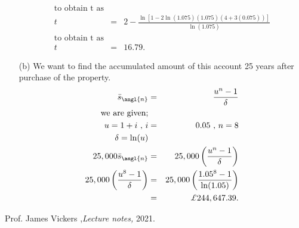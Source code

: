 \documentclass[12pt,a4paper]{article}
\begin{document}
\begin{enumerate}
\begin{eqnarray*}
 \text{to obtain t as}\\
  t&=& 2-\frac{\ln \left[1-2\ln(1.075)(1.075)(4+3(0.075)) \right]}{\ln(1.075)}\\
 \text{to obtain t as}\\
 t&=& 16.79.
\end{eqnarray*}
 \item[(b)]
 We want to find the accumulated amount of this
account 25 years after purchase of the property.
\begin{eqnarray*}
\bar{s}_{\angl{n}}&=&\frac{u^n-1}{\delta}\\
\text{we are given;}\\
u= 1+i \,\, ,\,
i&=& 0.05\,\, , \,
n= 8\\
\delta = \ln (u)\\
25,000 \bar{s}_{\angl{n}}&=&25,000\left(\frac{u^n-1}{\delta}\right)\\
25,000\left(\frac{u^8-1}{\delta}\right)&=&25,000\left(\frac{1.05^8-1}{\ln(1.05)}\right)\\
&=& \pounds 244,647.39.
\end{eqnarray*}
\end{enumerate}
\newpage
\begin{thebibliography}{99}

   Prof. James Vickers  ,{\em Lecture notes,}  2021.\\
%
%  
%
\end{thebibliography}
\end{document}
